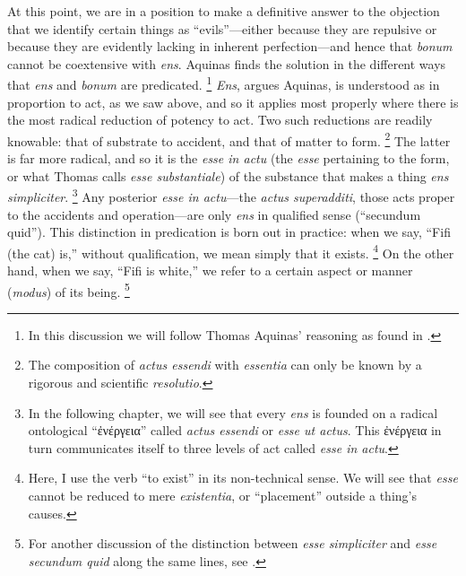 At this point, we are in a position to make a definitive answer to the objection that we identify certain things as “evils”—either because they are repulsive or because they are evidently lacking in inherent perfection—and hence that \emph{bonum} cannot be coextensive with \emph{ens}. Aquinas finds the solution in the different ways that \emph{ens} and \emph{bonum} are predicated.%
%
\footnote{In this discussion we will follow Thomas Aquinas’ reasoning as found in \cite[I, q.~5, a.~1, co.]{st:summa}.} \emph{Ens}, argues Aquinas, is understood as in proportion to act, as we saw above, and so it applies most properly where there is the most radical reduction of potency to act. Two such reductions are readily knowable: that of substrate to accident, and that of matter to form.%
%
\footnote{The composition of \emph{actus essendi} with \emph{essentia} can only be known by a rigorous and scientific \emph{resolutio}.} The latter is far more radical, and so it is the \emph{esse in actu} (the \emph{esse} pertaining to the form, or what Thomas calls \emph{esse substantiale}) of the substance that makes a thing \emph{ens simpliciter}.%
%
\footnote{In the following chapter, we will see that every \emph{ens} is founded on a radical ontological “ἐνέργεια” called \emph{actus essendi} or \emph{esse ut actus}. This ἐνέργεια in turn communicates itself to three levels of act called \emph{esse in actu}.} Any posterior \emph{esse in actu}—the \emph{actus superadditi}, those acts proper to the accidents and operation—are only \emph{ens} in qualified sense (“secundum quid”). This distinction in predication is born out in practice: when we say, “Fifi (the cat) is,” without qualification, we mean simply that it exists.%
%
\footnote{Here, I use the verb “to exist” in its non-technical sense. We will see that \emph{esse} cannot be reduced to mere \emph{existentia}, or “placement” outside a thing’s causes.} On the other hand, when we say, “Fifi is white,” we refer to a certain aspect or manner (\emph{modus}) of its being.%
%
\footnote{For another discussion of the distinction between \emph{esse simpliciter} and \emph{esse secundum quid} along the same lines, see \cite[I, q.~76, a.~4, co.]{st:summa}.}
%


